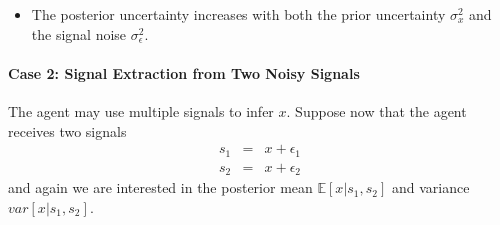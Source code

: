 \documentclass[12pt]{article}
\begin{document}
\begin{itemize}
\begin{align}
		& = \frac{\sigma_\epsilon^4}{(\sigma^2_\epsilon + \sigma^2_x)^2} \sigma^2_x + \frac{\sigma_x^4}{(\sigma^2_\epsilon + \sigma^2_x)^2} \sigma^2_\epsilon + 2 \frac{\sigma^2_\epsilon \sigma^2_x}{(\sigma^2_\epsilon + \sigma^2_x)^2} \underbrace{\mathbb{E}[(x-\bar{x})(s-x)]}_{= 0} \nonumber \\
		& = \frac{\sigma^2_\epsilon \sigma^2_x (\sigma^2_x + \sigma^2_\epsilon)}{(\sigma^2_\epsilon + \sigma^2_x)^2} = \frac{\sigma^2_\epsilon \sigma^2_x}{\sigma^2_\epsilon + \sigma^2_x}
	\end{align} 
\item The posterior uncertainty increases with both the prior uncertainty $\sigma^2_x$ and the signal noise $\sigma^2_\epsilon$.

\end{itemize}

\paragraph{Case 2: Signal Extraction from Two Noisy Signals \\ [6pt]}
The agent may use multiple signals to infer $x$. Suppose now that the agent receives two signals
\begin{eqnarray}
s_1 &=& x + \epsilon_1 \\
s_2 &=& x + \epsilon_2
\end{eqnarray}
and again we are interested in the posterior mean $\mathbb{E}[x|s_1, s_2]$ and variance $var[x|s_1, s_2]$. 
\end{document}
